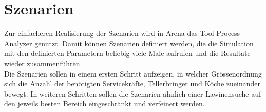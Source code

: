 \documentclass[ngerman,a4paper,12pt]{scrreprt}
\begin{document}
			
	\section{Szenarien}
		Zur einfacheren Realisierung der Szenarien wird in Arena das Tool Process Analyzer genutzt. Damit können Szenarien definiert werden, die die Simulation mit den definierten Parametern beliebig viele Male aufrufen und die Resultate wieder zusammenführen. \\
		
		Die Szenarien sollen in einem ersten Schritt aufzeigen, in welcher Grössenordnung sich die Anzahl der benötigten Servicekräfte, Tellerbringer und Köche zueinander bewegt. In weiteren Schritten sollen die Szenarien ähnlich einer Lawinensuche auf den jeweils besten Bereich eingeschränkt und verfeinert werden.
			
			
\end{document}
